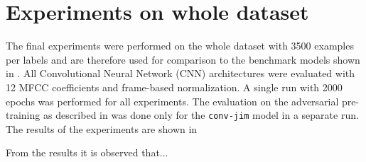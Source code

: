 
\section{Experiments on whole dataset}\label{sec:exp_final}
The final experiments were performed on the whole dataset with 3500 examples per labels and are therefore used for comparison to the benchmark models shown in .
All Convolutional Neural Network (CNN) architectures were evaluated with 12 MFCC coefficients and frame-based normalization.
A single run with 2000 epochs was performed for all experiments.
The evaluation on the adversarial pre-training as described in  was done only for the \texttt{conv-jim} model in a separate run.
The results of the experiments are shown in 

From the results it is observed that...